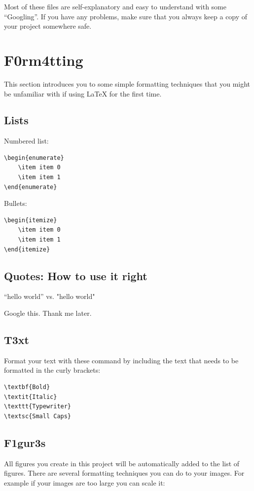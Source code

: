 Most of these files are self-explanatory and easy to understand with some ``Googling''. If you have any problems, make sure that you always keep a copy of your project somewhere safe.

\section{F0rm4tting}
This section introduces you to some simple formatting techniques that you might be unfamiliar with if using \LaTeX{} for the first time.

\subsection{Lists}
Numbered list:
\begin{verbatim}
\begin{enumerate}
    \item item 0
    \item item 1
\end{enumerate}
\end{verbatim}
Bullets:
\begin{verbatim}
\begin{itemize}
    \item item 0
    \item item 1
\end{itemize}
\end{verbatim}

\subsection{Quotes: How to use it right}
``hello world'' vs. "hello world"

Google this. Thank me later.

\subsection{T3xt}
Format your text with these command by including the text that needs to be formatted in the curly brackets:

\begin{verbatim}
\textbf{Bold}
\textit{Italic}
\texttt{Typewriter}
\textsc{Small Caps}
\end{verbatim}

\subsection{F1gur3s}
All figures you create in this project will be automatically added to the list of figures. There are several formatting techniques you can do to your images. For example if your images are too large you can scale it:

